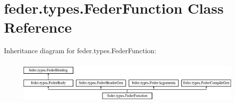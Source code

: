 \hypertarget{classfeder_1_1types_1_1FederFunction}{}\section{feder.\+types.\+Feder\+Function Class Reference}
\label{classfeder_1_1types_1_1FederFunction}
Inheritance diagram for feder.\+types.\+Feder\+Function\+:\begin{figure}[H]
\begin{center}
\leavevmode
\includegraphics[height=2.210526cm]{classfeder_1_1types_1_1FederFunction}
\end{center}
\end{figure}
